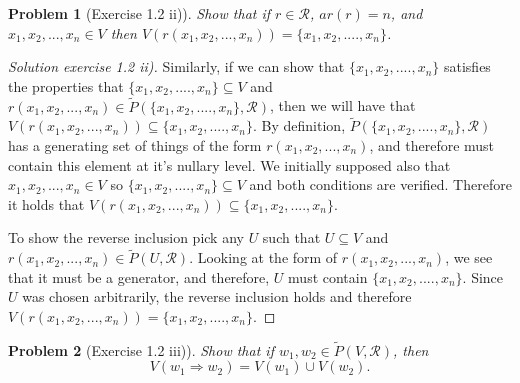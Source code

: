 \documentclass{article}
\theoremstyle{problemstyle}
\newtheorem{problem}{Problem}
\begin{document}
\begin{problem}[Exercise 1.2 ii)] 
Show that if $r \in \mathscr{R}$, $ar(r) = n$, and $x_1,x_2,...,x_n \in V$ then $V(r(x_1,x_2,...,x_n)) = \{x_1,x_2,....,x_n\}$.
\end{problem}

\begin{proof}[Solution exercise 1.2 ii)]
Similarly, if we can show that $\{x_1,x_2,....,x_n\}$ satisfies the properties that $\{x_1,x_2,....,x_n\} \subseteq V$ and $r(x_1,x_2,...,x_n) \in \widetilde{P}(\{x_1,x_2,....,x_n\},\mathscr{R})$, then we will have that $V(r(x_1,x_2,...,x_n)) \subseteq \{x_1,x_2,....,x_n\}$. By definition, $\widetilde{P}(\{x_1,x_2,....,x_n\},\mathscr{R})$ has a generating set of things of the form $r(x_1,x_2,...,x_n)$, and therefore must contain this element at it's nullary level. We initially supposed also that $x_1,x_2,...,x_n \in V$ so $\{x_1,x_2,....,x_n\} \subseteq V$ and both conditions are verified. Therefore it holds that $V(r(x_1,x_2,...,x_n)) \subseteq \{x_1,x_2,....,x_n\}$. 

To show the reverse inclusion pick any $U$ such that $U \subseteq V$ and $r(x_1,x_2,...,x_n) \in \widetilde{P}(U,\mathscr{R})$. Looking at the form of $r(x_1,x_2,...,x_n)$, we see that it must be a generator, and therefore, $U$ must contain $\{x_1,x_2,....,x_n\}$. Since $U$ was chosen arbitrarily, the reverse inclusion holds and therefore $V(r(x_1,x_2,...,x_n)) = \{x_1,x_2,....,x_n\}$.
\end{proof}

\begin{problem}[Exercise 1.2 iii)] 
Show that if $w_1,w_2 \in \widetilde{P}(V,\mathscr{R})$, then $$V(w_1\Rightarrow w_2) = V(w_1) \cup V(w_2).$$
\end{problem}
\end{document}
